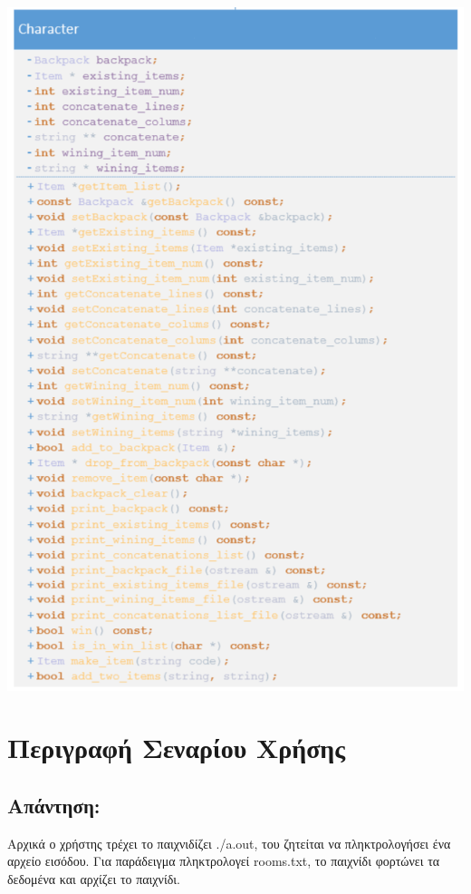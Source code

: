 \begin{center}
			\includegraphics[width=1\textwidth]{image/1.5.5.PNG}
\end{center}

\section{Περιγραφή Σεναρίου Χρήσης}
\subsection*{Απάντηση:}

\noindent
Αρχικά ο χρήστης τρέχει το παιχνιδίζει ./a.out, του ζητείται να πληκτρολογήσει ένα αρχείο εισόδου. Για παράδειγμα πληκτρολογεί rooms.txt, το παιχνίδι φορτώνει τα δεδομένα και αρχίζει το παιχνίδι.

